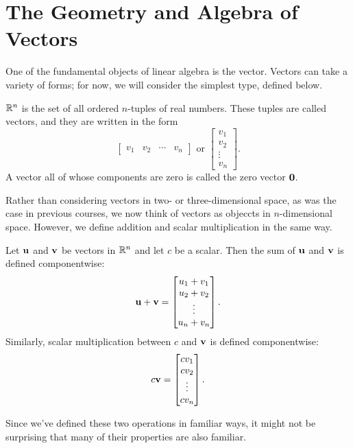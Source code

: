 \documentclass[../m73main.tex]{chapters}
\begin{document}
\section{The Geometry and Algebra of Vectors}
One of the fundamental objects of linear algebra is the vector.
Vectors can take a variety of forms; for now, we will consider the simplest type, defined below.

\begin{definition}[Vectors in $\R^n$]
	$\R^n$ is the set of all ordered $n$-tuples of real numbers.
	These tuples are called vectors, and they are written in the form
	\[ \begin{bmatrix} v_1 & v_2 & \cdots & v_n \end{bmatrix} \text{ or } \begin{bmatrix} v_1 \\ v_2 \\ \vdots \\ v_n \end{bmatrix}. \]
	A vector all of whose components are zero is called the zero vector $\mathbf{0}$.
\end{definition}

Rather than considering vectors in two- or three-dimensional space, as was the case in previous courses, we now think of vectors as objeccts in $n$-dimensional space.
However, we define addition and scalar multiplication in the same way.

\begin{definition}
	Let $\mathbf{u}$ and $\mathbf{v}$ be vectors in $\R^n$ and let $c$ be a scalar.
	Then the sum of $\mathbf{u}$ and $\mathbf{v}$ is defined componentwise:
	\[ \mathbf{u} + \mathbf{v} = \begin{bmatrix} u_1 + v_1 \\ u_2 + v_2 \\ \vdots \\ u_n + v_n \end{bmatrix}. \]
	Similarly, scalar multiplication between $c$ and $\mathbf{v}$ is defined componentwise:
	\[ c \mathbf{v} = \begin{bmatrix} cv_1 \\ cv_2 \\ \vdots \\ cv_n \end{bmatrix}. \]
\end{definition}

Since we've defined these two operations in familiar ways, it might not be surprising that many of their properties are also familiar.
\end{document}
